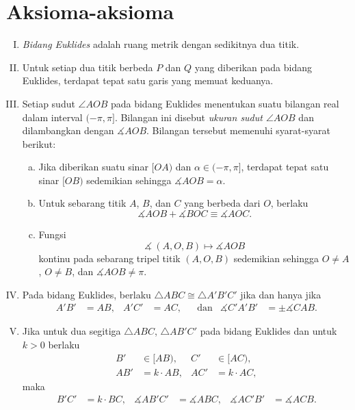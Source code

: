 \newpage
\vspace*{3\baselineskip}

\section{Aksioma-aksioma}
\label{sec:axioms}


\begin{framed}
\begin{enumerate}[I.]
\item\label{def:birkhoff-axioms:0} \emph{Bidang Euklides} adalah ruang metrik dengan sedikitnya dua titik.


\item\label{def:birkhoff-axioms:1} 
Untuk setiap dua titik berbeda $P$ dan $Q$ yang diberikan pada bidang Euklides, terdapat tepat satu garis yang memuat keduanya.

\item\label{def:birkhoff-axioms:2} 
Setiap sudut $\angle AOB$ pada bidang Euklides
menentukan suatu bilangan real dalam interval $(-\pi,\pi]$.
Bilangan ini disebut \emph{ukuran sudut $\angle AOB$}
dan dilambangkan dengan $\measuredangle A O B$.
Bilangan tersebut memenuhi syarat-syarat berikut:
\begin{enumerate}[(a)]
\item\label{def:birkhoff-axioms:2a} 
Jika diberikan suatu sinar $[O A)$ dan $\alpha\in(-\pi,\pi]$, 
terdapat tepat satu sinar $[O B)$ 
sedemikian sehingga $\measuredangle A O B= \alpha$.
\item\label{def:birkhoff-axioms:2b} 
Untuk sebarang titik $A$, $B$, dan $C$ yang berbeda dari $O$, berlaku
$$\measuredangle A O B+\measuredangle B O C
\equiv\measuredangle A O C.$$
\item\label{def:birkhoff-axioms:2c} 
Fungsi 
$$\measuredangle\:(A,O,B)\mapsto\measuredangle A O B$$
kontinu pada sebarang tripel titik $(A,O,B)$
sedemikian sehingga $O\ne A$, $O\ne B$, dan $\measuredangle A O B\ne\pi$.

\end{enumerate}

\item\label{def:birkhoff-axioms:3}  
Pada bidang Euklides, berlaku
$\triangle A B C\cong\triangle A' B' C'$
jika dan hanya jika 
\begin{align*}
A' B'&=A B, & A' C'&= A C, &&\text{dan}
&\measuredangle C' A' B'&=\pm\measuredangle C A B.
\end{align*}
\item\label{def:birkhoff-axioms:4}
Jika untuk dua segitiga $\triangle ABC$, $\triangle AB'C'$ pada bidang Euklides
dan untuk $k>0$ berlaku
\begin{align*}
B'&\in [AB),
& C'&\in [AC),
\\
AB'&=k\cdot AB,&
AC'&=k\cdot AC,
\end{align*}
maka
\begin{align*}
B'C'&=k\cdot BC,&
\measuredangle AB'C'&=\measuredangle ABC,
&
\measuredangle AC'B'&=\measuredangle ACB.
\end{align*}
\end{enumerate}
\end{framed}

